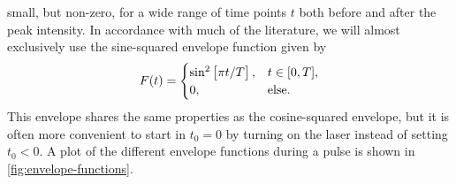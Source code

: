             small, but non-zero, for a wide range of time points $t$ both before
            and after the peak intensity.
            In accordance with much of the literature, we will almost
            exclusively use the sine-squared envelope function given by
            \begin{align}
                F(t) = \begin{cases}
                    \sin^2\left[ 
                        \pi t / T
                     \right], & t \in [0, T], \\
                    0, & \text{else}.
                \end{cases}
            \end{align}
            This envelope shares the same properties as the cosine-squared
            envelope, but it is often more convenient to start in $t_0 = 0$ by
            turning on the laser instead of setting $t_0 < 0$.
            A plot of the different envelope functions during a pulse is shown
            in \autoref{fig:envelope-functions}.

